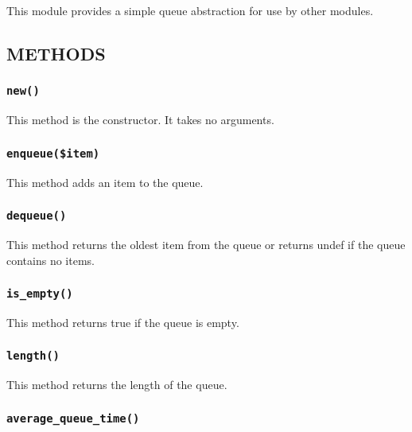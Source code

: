 This module provides a simple queue abstraction for use by other modules.

\subsection*{METHODS\label{xPL::Queue_METHODS}}
\subsubsection*{\texttt{new()}\label{xPL::Queue_new_}}


This method is the constructor.  It takes no arguments.

\subsubsection*{\texttt{enqueue(\$item)}\label{xPL::Queue_enqueue_item_}}


This method adds an item to the queue.

\subsubsection*{\texttt{dequeue()}\label{xPL::Queue_dequeue_}}


This method returns the oldest item from the queue or returns undef if
the queue contains no items.

\subsubsection*{\texttt{is\_empty()}\label{xPL::Queue_is_empty_}}


This method returns true if the queue is empty.

\subsubsection*{\texttt{length()}\label{xPL::Queue_length_}}


This method returns the length of the queue.

\subsubsection*{\texttt{average\_queue\_time()}\label{xPL::Queue_average_queue_time_}}


